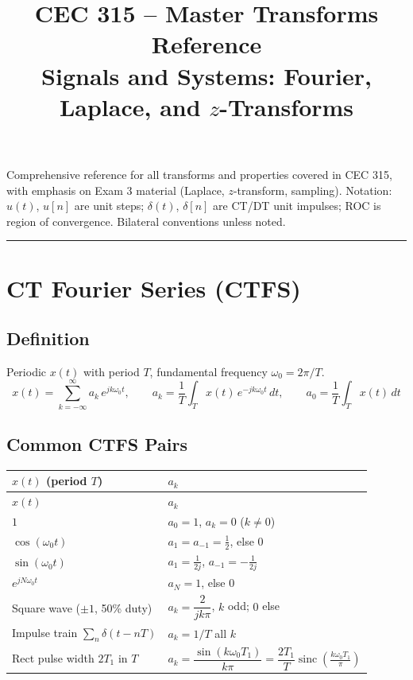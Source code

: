 \documentclass[10pt]{article}
\title{\textbf{CEC 315 -- Master Transforms Reference}\\[4pt]
\large Signals and Systems: Fourier, Laplace, and $z$-Transforms}
\author{}
\date{}
\newcommand{\sinc}{\operatorname{sinc}}
\begin{document}
\maketitle
\vspace{-3em}

\begin{center}
\small
Comprehensive reference for all transforms and properties covered in CEC 315, with emphasis on Exam 3 material (Laplace, $z$-transform, sampling). Notation: $u(t)$, $u[n]$ are unit steps; $\delta(t)$, $\delta[n]$ are CT/DT unit impulses; ROC is region of convergence. Bilateral conventions unless noted.
\end{center}

\tableofcontents
\vspace{1em}
\hrule
\vspace{1em}

\section{CT Fourier Series (CTFS)}

\subsection{Definition}
Periodic $x(t)$ with period $T$, fundamental frequency $\omega_0 = 2\pi/T$.
\[
x(t) = \sum_{k=-\infty}^{\infty} a_k\, e^{jk\omega_0 t},\qquad
a_k = \frac{1}{T}\int_T x(t)\,e^{-jk\omega_0 t}\,dt,\qquad
a_0 = \frac{1}{T}\int_T x(t)\,dt
\]

\subsection{Common CTFS Pairs}
\begin{longtable}{@{}ll@{}}
\toprule
$x(t)$ (period $T$) & $a_k$ \\
\midrule \endfirsthead
\toprule $x(t)$ & $a_k$ \\ \midrule \endhead
\bottomrule \endfoot
$1$ & $a_0 = 1$, $a_k = 0$ ($k\ne 0$) \\
$\cos(\omega_0 t)$ & $a_1 = a_{-1} = \tfrac{1}{2}$, else $0$ \\
$\sin(\omega_0 t)$ & $a_1 = \tfrac{1}{2j}$, $a_{-1} = -\tfrac{1}{2j}$ \\
$e^{jN\omega_0 t}$ & $a_N = 1$, else $0$ \\
Square wave ($\pm 1$, 50\% duty) & $a_k = \dfrac{2}{jk\pi}$, $k$ odd; $0$ else \\
Impulse train $\sum_n \delta(t-nT)$ & $a_k = 1/T$ all $k$ \\
Rect pulse width $2T_1$ in $T$ & $a_k = \dfrac{\sin(k\omega_0 T_1)}{k\pi} = \dfrac{2T_1}{T}\sinc\!\left(\tfrac{k\omega_0 T_1}{\pi}\right)$ \\
\end{longtable}
\end{document}
